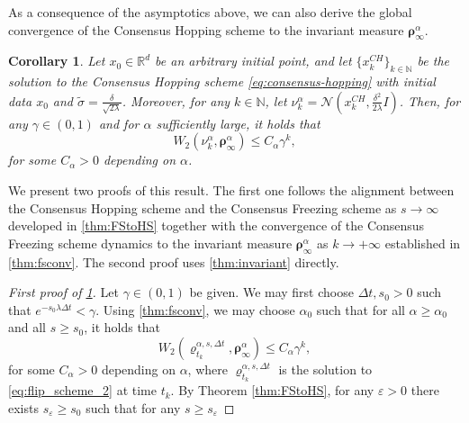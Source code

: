 \documentclass[reqno]{amsart}
\numberwithin{algorithm}{section}
\newcommand{\RR}{\mathbb{R}}
\newcommand{\NN}{{\mathbb N}}
\newtheorem{corollary}[theorem]{Corollary}
\begin{document}
{As a consequence of the asymptotics above, we can also derive the global convergence of the Consensus Hopping scheme to the invariant measure $\boldsymbol\rho_\infty^\alpha$.

\begin{corollary}\label{cor:HS_convergence}
 Let $x_0 \in \RR^d$ be an arbitrary initial point, and let $\{x_k^{CH}\}_{k \in \NN}$ be the solution to the Consensus Hopping scheme \eqref{eq:consensus-hopping} with initial data $x_0$ and $\tilde{\sigma} = \frac{\delta}{\sqrt{2\lambda}}$. Moreover, for any $k\in\NN$, let $\nu_k^\alpha=\mathcal N(x_k^{CH}, \frac{\delta^2}{2\lambda}I)$. 
 Then, for any $\gamma \in (0, 1)$ and for $\alpha$ sufficiently large, it holds that
 \begin{equation*}
        W_2(\nu_k^\alpha, \boldsymbol\rho_\infty^\alpha) \leq C_\alpha \gamma^k,
 \end{equation*}
 for some $C_\alpha > 0$ depending on $\alpha$.
\end{corollary}
We present two proofs of this result. The first one follows the alignment between the Consensus Hopping scheme and the Consensus Freezing scheme as $s \to \infty$ developed in \cref{thm:FStoHS} together with the convergence of the Consensus Freezing scheme dynamics to the invariant measure $\boldsymbol\rho_\infty^\alpha$ as $k\to+\infty$ established in \cref{thm:fsconv}. The second proof uses \cref{thm:invariant} directly.
\begin{proof}[First proof of \cref{cor:HS_convergence}]
    Let $\gamma \in (0, 1)$ be given. We may first choose $\Delta t, s_0 > 0$ such that $e^{-s_0 \lambda \Delta t} < \gamma$. Using \cref{thm:fsconv}, we may choose $\alpha_0$ such that for all $\alpha \geq \alpha_0$ and all $s \geq s_0$, it holds that
    \begin{equation}\label{eq:fs_conv_corollary}
        W_2(\varrho_{t_k}^{\alpha,s,\Delta t}, \boldsymbol\rho_\infty^\alpha) \leq C_\alpha \gamma^k,
    \end{equation}
    for some $C_\alpha > 0$ depending on $\alpha$, where $\varrho_{t_k}^{\alpha,s,\Delta t}$ is the solution to \eqref{eq:flip_scheme_2} at time $t_k$. 
    By Theorem \ref{thm:FStoHS}, for any $\varepsilon > 0$ there exists $s_\varepsilon \geq s_0$ such that for any $s\geq s_\varepsilon$

\end{proof}}
\end{document}
